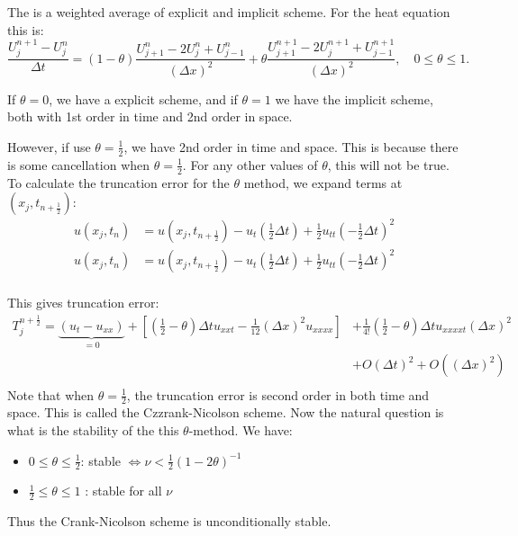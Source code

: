 \documentclass[../main/main.tex]{subfiles}
\begin{document}
\begin{definition}
    The  is a weighted average of explicit and implicit scheme. For the heat equation this is: \[
        \frac{U^{n+1}_j-U^n_j}{\Delta t} = (1-\theta) \frac{U^{n}_{j+1}-2U^n_j+U^n_{j-1}}{(\Delta x)^2} + \theta \frac{U^{n+1}_{j+1} - 2U^{n+1}_j + U^{n+1}_{j-1}}{(\Delta x)^2}, \quad 0 \le  \theta \le  1
    .\]  
\end{definition}
\begin{remark}
   If $\theta = 0$, we have a explicit scheme, and if $\theta = 1$ we have the implicit scheme, both with 1st order in time and 2nd order in space.
\end{remark}
However, if use $\theta = \frac{1}{2}$, we have 2nd order in time and space. This is because there is some cancellation when $\theta = \frac{1}{2}$. For any other values of $\theta$, this will not be true. To calculate the truncation error for the $\theta$ method, we expand terms  at  $(x_j, t_{n+\frac{1}{2}})$: 
\begin{align*}
    u(x_j,t_n) &= u(x_j,t_{n+\frac{1}{2}}) - u_t(\frac{1}{2}\Delta t) + \frac{1}{2}u_{tt}\left( -\frac{1}{2}\Delta t \right) ^2 \\ 
    u(x_j,t_n) &= u(x_j,t_{n+\frac{1}{2}}) - u_t(\frac{1}{2}\Delta t) + \frac{1}{2}u_{tt}\left( -\frac{1}{2}\Delta t \right) ^2 \\ 
\end{align*}

This gives truncation error: 
\begin{align*} 
    T_j^{n+\frac{1}{2}} = \underbrace{\left( u_t - u_{x x} \right)}_{=0} + \left[(\frac{1}{2}-\theta) \Delta t u_{xx t} - \frac{1}{12} \left( \Delta x \right) ^2 u_{x x x x}\right] &+ \frac{1}{4!}\left( \frac{1}{2}-\theta \right) \Delta t u_{x x x x t}(\Delta x)^2 \\
    &+ O(\Delta t)^2 + O((\Delta x)^2) \\
\end{align*}
Note that when $\theta=\frac{1}{2}$, the truncation error is second order in both time and space. This is called the Czzrank-Nicolson scheme.
Now the natural question is what is the stability of the this $\theta$-method.
We have: 
\begin{itemize}
    \item $0\le \theta \le  \frac{1}{2}$: stable $ \iff \nu < \frac{1}{2}(1-2\theta)^{-1}$
    \item $\frac{1}{2} \le  \theta \le  1$ : stable for all $\nu$
\end{itemize}
Thus the Crank-Nicolson scheme is unconditionally stable.
\end{document}
